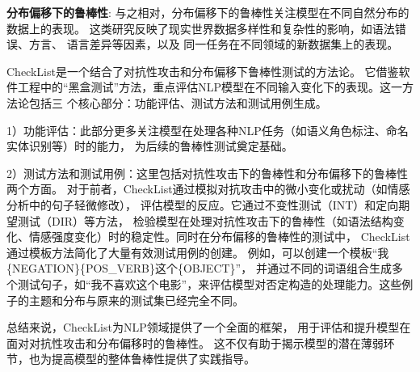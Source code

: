 \textbf{分布偏移下的鲁棒性}:
与之相对，分布偏移下的鲁棒性关注模型在不同自然分布的数据上的表现。
这类研究反映了现实世界数据多样性和复杂性的影响，如语法错误、方言、
语言差异等因素\cite{blodgett2016demographic, demszky2021learning}，以及
同一任务在不同领域的新数据集上的表现。

CheckList\cite{Marco2020acl}是一个结合了对抗性攻击和分布偏移下鲁棒性测试的方法论。
它借鉴软件工程中的``黑盒测试''方法，重点评估NLP模型在不同输入变化下的表现。这一方法论包括三
个核心部分：功能评估、测试方法和测试用例生成。

1）功能评估：此部分更多关注模型在处理各种NLP任务（如语义角色标注、命名实体识别等）时的能力，
为后续的鲁棒性测试奠定基础。

2）测试方法和测试用例：这里包括对抗性攻击下的鲁棒性和分布偏移下的鲁棒性两个方面。
对于前者，CheckList通过模拟对抗攻击中的微小变化或扰动（如情感分析中的句子轻微修改），
评估模型的反应\cite{goodfellow2014explaining}。它通过不变性测试（INT）和定向期望测试（DIR）等方法，
检验模型在处理对抗性攻击下的鲁棒性（如语法结构变化、情感强度变化）时的稳定性。同时在分布偏移的鲁棒性的测试中，
CheckList通过模板方法简化了大量有效测试用例的创建。
例如，可以创建一个模板``我\{NEGATION\}\{POS\_VERB\}这个\{OBJECT\}''，
并通过不同的词语组合生成多个测试句子，如``我不喜欢这个电影''，来评估模型对否定构造的处理能力。这些例子的主题和分布与原来的测试集已经完全不同。

总结来说，CheckList为NLP领域提供了一个全面的框架，
用于评估和提升模型在面对对抗性攻击和分布偏移时的鲁棒性。
这不仅有助于揭示模型的潜在薄弱环节，也为提高模型的整体鲁棒性提供了实践指导。




